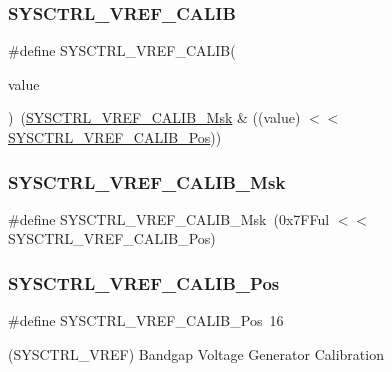\subsubsection{\texorpdfstring{SYSCTRL\_VREF\_CALIB}{SYSCTRL\_VREF\_CALIB}}
{\footnotesize\ttfamily \#define S\+Y\+S\+C\+T\+R\+L\+\_\+\+V\+R\+E\+F\+\_\+\+C\+A\+L\+IB(\begin{DoxyParamCaption}\item[{}]{value }\end{DoxyParamCaption})~(\mbox{\hyperlink{group___s_a_m_d21___s_y_s_c_t_r_l_gabe2aa4d5e38bdf226902f08c0592cad5}{S\+Y\+S\+C\+T\+R\+L\+\_\+\+V\+R\+E\+F\+\_\+\+C\+A\+L\+I\+B\+\_\+\+Msk}} \& ((value) $<$$<$ \mbox{\hyperlink{group___s_a_m_d21___s_y_s_c_t_r_l_ga9c806f83441128a47d9f6a453a9f2487}{S\+Y\+S\+C\+T\+R\+L\+\_\+\+V\+R\+E\+F\+\_\+\+C\+A\+L\+I\+B\+\_\+\+Pos}}))}

\mbox{\label{group___s_a_m_d21___s_y_s_c_t_r_l_gabe2aa4d5e38bdf226902f08c0592cad5}} 
\subsubsection{\texorpdfstring{SYSCTRL\_VREF\_CALIB\_Msk}{SYSCTRL\_VREF\_CALIB\_Msk}}
{\footnotesize\ttfamily \#define S\+Y\+S\+C\+T\+R\+L\+\_\+\+V\+R\+E\+F\+\_\+\+C\+A\+L\+I\+B\+\_\+\+Msk~(0x7\+F\+Ful $<$$<$ S\+Y\+S\+C\+T\+R\+L\+\_\+\+V\+R\+E\+F\+\_\+\+C\+A\+L\+I\+B\+\_\+\+Pos)}

\mbox{\label{group___s_a_m_d21___s_y_s_c_t_r_l_ga9c806f83441128a47d9f6a453a9f2487}} 
\subsubsection{\texorpdfstring{SYSCTRL\_VREF\_CALIB\_Pos}{SYSCTRL\_VREF\_CALIB\_Pos}}
{\footnotesize\ttfamily \#define S\+Y\+S\+C\+T\+R\+L\+\_\+\+V\+R\+E\+F\+\_\+\+C\+A\+L\+I\+B\+\_\+\+Pos~16}



(S\+Y\+S\+C\+T\+R\+L\+\_\+\+V\+R\+EF) Bandgap Voltage Generator Calibration 

